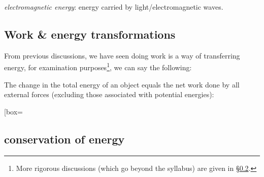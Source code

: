 \documentclass[a4paper,12pt]{book}
\newcommand{\piste}{{\fontencoding{U}\fontfamily{futs}\selectfont\char 49\relax}}
\newenvironment{ilight}
  {\centering
  	\vspace*{6pt}
  	\begin{tcolorbox}[colframe=Gray,colback=LightGrey!15]
  \setlength{\baselineskip}{\baselineskip}%
  }
  {\end{tcolorbox}\vspace*{-4pt}}
\newcommand{\titem}{\item}
\newcommand{\tcbhighmath}[1]{\boxed{#1}}
\newcommand{\piste}{\textsuperscript{$\star$}}
\begin{document}
\titem \emph{electromagnetic energy}: energy carried by light/electromagnetic waves.

\subsection{Work \& energy transformations}

From previous discussions, we have seen doing work is a way of transferring energy,  for examination purposes\footnote{More rigorous discussions (which go beyond the syllabus) are given in \S\ref{ch:conservation-of-energy}.}, we can say the following:

\begin{ilight}
	The change in the total energy of an object equals the net work done by all external forces (excluding those associated with potential energies): \begin{empheq}[box=\tcbhighmath]{equation*}{W  = \Delta E} \end{empheq}
\end{ilight}

\subsection{conservation of energy}\label{ch:conservation-of-energy}




\end{document}
